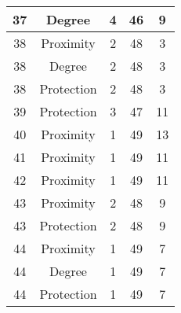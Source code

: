 \documentclass[results.tex]{subfiles}
\begin{document}
\begin{center}
\begin{tabular}{| c || c | c | c | c |}
            \hline
            37                      & Degree                       & 4                      & 46                      & 9                    \\
            \hline
            38                      & Proximity                    & 2                      & 48                      & 3                    \\
            \hline
            38                      & Degree                       & 2                      & 48                      & 3                    \\
            \hline
            38                      & Protection                   & 2                      & 48                      & 3                    \\
            \hline
            39                      & Protection                   & 3                      & 47                      & 11                   \\
            \hline
            40                      & Proximity                    & 1                      & 49                      & 13                   \\
            \hline
            41                      & Proximity                    & 1                      & 49                      & 11                   \\
            \hline
            42                      & Proximity                    & 1                      & 49                      & 11                   \\
            \hline
            43                      & Proximity                    & 2                      & 48                      & 9                    \\
            \hline
            43                      & Protection                   & 2                      & 48                      & 9                    \\
            \hline
            44                      & Proximity                    & 1                      & 49                      & 7                    \\
            \hline
            44                      & Degree                       & 1                      & 49                      & 7                    \\
            \hline
            44                      & Protection                   & 1                      & 49                      & 7                    \\

\end{tabular}
\end{center}
\end{document}
